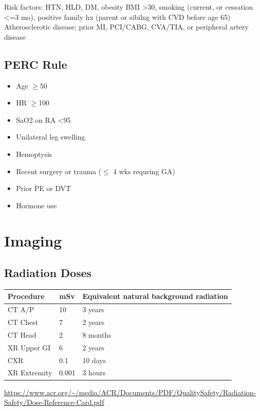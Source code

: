 \documentclass[8pt]{extarticle}
\begin{document}
\tiny{Risk factors: HTN, HLD, DM, obesity BMI >30, smoking (current, or cessation <=3 mo), positive family hx (parent or sibilng with CVD before age 65)}\\
\tiny{Atherosclerotic disease: prior MI, PCI/CABG, CVA/TIA, or peripheral artery disease}

\subsection{PERC Rule}
    \begin{itemize}
        \item Age $\geq$50
        \item HR $\geq$100
        \item SaO2 on RA <95%
        \item Unilateral leg swelling
        \item Hemoptysis
        \item Recent surgery or trauma ($\leq$ 4 wks requring GA)
        \item Prior PE or DVT
        \item Hormone use
    \end{itemize}


\section{Imaging}
\subsection{Radiation Doses}

\begin{tabularx}{\linewidth}{|X|X|X|}
\hline
\textbf{Procedure} & \textbf{mSv} & \textbf{Equivalent natural background radiation} \\
\hline
CT A/P & 10 & 3 years  \\
\hline
CT Chest & 7 & 2 years  \\
\hline
CT Head & 2 & 8 months  \\
\hline
XR Upper GI & 6 & 2 years  \\
\hline
CXR & 0.1 & 10 days  \\
\hline
XR Extremity & 0.001 & 3 hours  \\
\hline
\end{tabularx}
\url{https://www.acr.org/~/media/ACR/Documents/PDF/QualitySafety/Radiation-Safety/Dose-Reference-Card.pdf}
\end{document}
